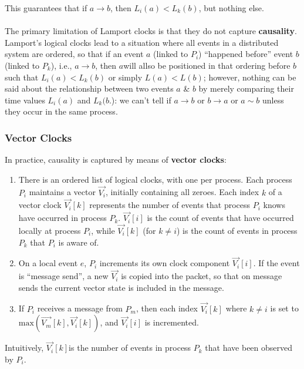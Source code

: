 \documentclass[a4paper,11pt]{article}
\begin{document}
This guarantees that if $a \rightarrow b$, then $L_i(a) < L_k(b)$, but nothing else.
\\\\
The primary limitation of Lamport clocks is that they do not capture \textbf{causality}.
Lamport's logical clocks lead to a situation where all events in a distributed system are ordered, so that if an event $a$ (linked to $P_i$) ``happened before''  event $b$ (linked to $P_k$), i.e., $a \rightarrow b$, then $a$will allso be positioned in that ordering before $b$ such that $L_i(a) < L_k(b)$ or simply $L(a) < L(b)$;
however, nothing can be said about the relationship between two events $a$ \& $b$ by merely comparing their time values $L_i(a)$ and $L_k(b$.): we can't tell if $a \rightarrow b$ or $b \rightarrow a$ or $a \sim b$ unless they occur in the same process.

\subsubsection{Vector Clocks}
In practice, causality is captured by means of \textbf{vector clocks}:
\begin{enumerate}
    \item   There is an ordered list of logical clocks, with one per process.
            Each process $P_i$ maintains a vector $\vec{V_i}$, initially containing all zeroes.
            Each index $k$ of a vector clock $\vec{V_i}[k]$ represents the number of events that process $P_i$ knows have occurred in process $P_k$.
            $\vec{V_i}[i]$  is the count of events that have occurred locally at process $P_i$, while $\vec{V_i}[k]$ (for $k\neq i$) is the count of events in process $P_k$ that $P_i$ is aware of.

    \item   On a local event $e$, $P_i$ increments its own clock component $\vec{V_i}[i]$.
            If the event is ``message send'', a new $\vec{V_i}$ is copied into the packet, so that on message sends the current vector state is included in the message.

    \item   If $P_i$ receives a message from $P_m$, then each index $\vec{V_i}[k]$ where $k \neq i$ is set to $\text{max}(\vec{V_m}[k], \vec{V_i}[k])$, and $\vec{V_i}[i]$ is incremented.
\end{enumerate}

Intuitively, $\vec{V_i}[k]$is the number of events in process $P_k$ that have been observed by $P_i$.
\end{document}
